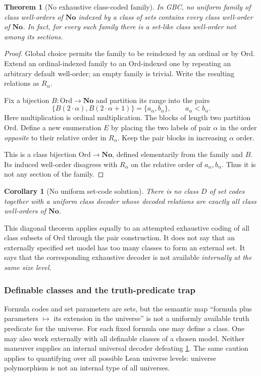 \documentclass[11pt]{article}
\newtheorem{theorem}{Theorem}[section]
\newtheorem{corollary}[corollary]{Corollary}
\theoremstyle{definition}
\theoremstyle{remark}
\newcommand{\No}{\mathbf{No}}
\newcommand{\Ord}{\mathrm{Ord}}
\begin{document}
\begin{theorem}[No exhaustive class-coded family]\label{swo:st:thm:diagonal}
In GBC, no uniform family of class well-orders of $\No$ indexed by a
class of sets contains every class well-order of $\No$. In fact, for
every such family there is a \emph{set-like} class well-order not among
its sections.
\end{theorem}
\begin{proof}
Global choice permits the family to be reindexed by an ordinal or by
$\Ord$. Extend an ordinal-indexed family to an $\Ord$-indexed one by
repeating an arbitrary default well-order; an empty family is trivial.
Write the resulting relations as $R_\alpha$.

Fix a bijection $B:\Ord\to\No$ and partition its range into the pairs
\[
 \{B(2\cdot\alpha),B(2\cdot\alpha+1)\}
   =\{a_\alpha,b_\alpha\},\qquad a_\alpha<b_\alpha.
\]
Here multiplication is ordinal multiplication. The blocks of length two
partition $\Ord$. Define a new enumeration $E$ by placing the two labels
of pair $\alpha$ in the order \emph{opposite} to their relative order in
$R_\alpha$. Keep the pair blocks in increasing $\alpha$ order.

This is a class bijection $\Ord\to\No$, defined elementarily from the
family and $B$. Its induced well-order disagrees with $R_\alpha$ on the
relative order of $a_\alpha,b_\alpha$. Thus it is not any section of the
family.
\end{proof}

\begin{corollary}[No uniform set-code solution]\label{swo:st:n5.2}
There is no class $D$ of set codes together with a uniform class decoder
whose decoded relations are exactly all class well-orders of $\No$.
\end{corollary}

This diagonal theorem applies equally to an attempted exhaustive coding
of all class subsets of $\Ord$ through the pair construction. It does not
say that an externally specified set model has too many classes to form
an external set. It says that the corresponding exhaustive decoder is
not available \emph{internally at the same size level}.

\subsubsection{Definable classes and the truth-predicate trap}

Formula codes and set parameters are sets, but the semantic map
``formula plus parameters $\mapsto$ its extension in the universe'' is
not a uniformly available truth predicate for the universe. For each
fixed formula one may define a class. One may also work externally with
all definable classes of a chosen model. Neither maneuver supplies an
internal universal decoder defeating \cref{swo:st:thm:diagonal}.
The same caution applies to quantifying over all possible Lean universe
levels: universe polymorphism is not an internal type of all universes.
\end{document}

